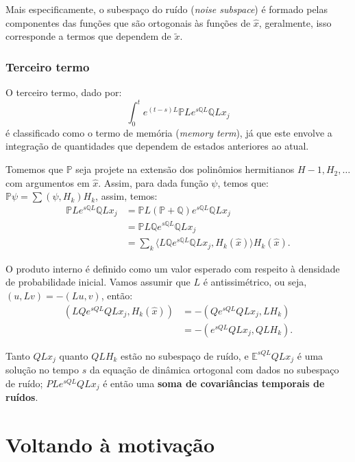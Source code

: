 Mais especificamente, o subespaço do ruído (\textit{noise subspace}) é formado pelas componentes das funções que são ortogonais às funções de $\hat{x}$, geralmente, isso corresponde a termos que dependem de $\tilde{x}$. 

\subsubsection{Terceiro termo}
O terceiro termo, dado por:
\begin{equation*}
	\int_0^t e^{(t-s)L} \mathbb{P}L e^{s\mathbb{Q}L} \mathbb{Q}L x_j
\end{equation*}
é classificado como o termo de memória  (\textit{memory term}), já que este envolve a integração de quantidades que dependem de estados anteriores ao atual.

Tomemos que $\mathbb{P}$ seja projete na extensão dos polinômios hermitianos $H-1, H_2, \ldots$ com argumentos em $\hat{x}$. Assim, para dada função $\psi$, temos que: $\mathbb{P}\psi = \sum (\psi, H_k)H_k$, assim, temos:
\begin{align*}
	\mathbb{P}Le^{s\mathbb{Q}L} \mathbb{Q}Lx_j & = \mathbb{P}L(\mathbb{P} + \mathbb{Q})e^{s\mathbb{Q}L} \mathbb{Q}Lx_j                           \\
	                                           & = \mathbb{P}L\mathbb{Q}e^{s\mathbb{Q}L} \mathbb{Q}Lx_j                                          \\
	                                           & = \sum_k \langle L\mathbb{Q}e^{s\mathbb{Q}L} \mathbb{Q}Lx_j, H_k(\hat{x}) \rangle H_k(\hat{x}). 
\end{align*}

O produto interno é definido como um valor esperado com respeito à densidade de probabilidade inicial. Vamos assumir que $L$ é antissimétrico, ou seja, $(u, Lv) = -(Lu, v)$, então:
\begin{align*}
	(L Q e^{s Q L} Q L x_j, H_k(\hat{x})) 
	  & = - (Q e^{s Q L} Q L x_j, L H_k)  \\
	  & = - (e^{s Q L} Q L x_j, Q L H_k). 
\end{align*}

Tanto $Q L x_j$ quanto $Q L H_k$ estão no subespaço de ruído, e $\mathbb{E}^{s Q L} Q L x_j$ é uma solução no tempo $s$ da equação de dinâmica ortogonal com dados no subespaço de ruído; $P L e^{s Q L} Q L x_j$ é então uma \textbf{soma de covariâncias temporais de ruídos}.



\section{Voltando à motivação}

